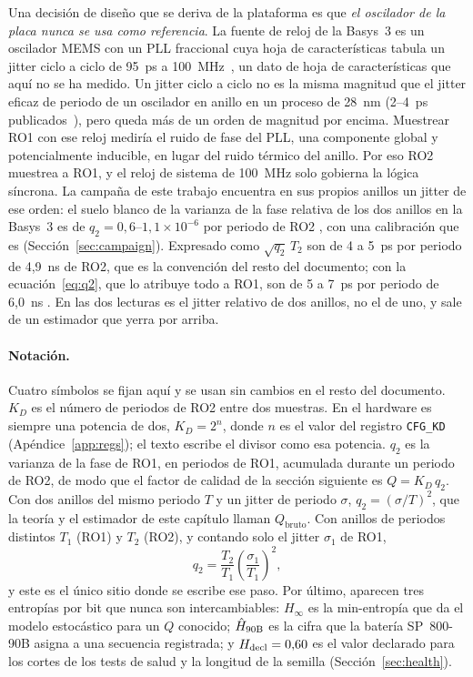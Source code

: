 Una decisión de diseño que se deriva de la plataforma es que \emph{el
oscilador de la placa nunca se usa como referencia}. La fuente de reloj de
la Basys~3 es un oscilador MEMS con un \ac{PLL} fraccional cuya hoja de
características tabula un jitter ciclo a ciclo de 95~ps a
100~MHz~\cite{micrel_dsc1033, digilent_2014_basys3rm}, un dato de hoja de
características que aquí no se ha medido. Un jitter ciclo a ciclo no es
la misma magnitud que el jitter eficaz de periodo de un oscilador en
anillo en un proceso de 28~nm (2--4~ps
publicados~\cite{petura_2016_survey}), pero queda más de un orden de
magnitud por encima. Muestrear RO1 con ese
reloj mediría el ruido de fase del PLL, una componente global y
potencialmente inducible, en lugar del ruido térmico del anillo. Por eso
RO2 muestrea a RO1, y el reloj de sistema de 100~MHz solo gobierna la
lógica síncrona. La campaña de este trabajo encuentra en sus propios
anillos un jitter de ese orden: el suelo blanco de la varianza de la fase
relativa de los dos anillos en la Basys~3 es de
$q_2 = 0{,}6$--$1{,}1\times10^{-6}$ por periodo de RO2 \meas{}, con una
calibración que es \simu{} (Sección~\ref{sec:campaign}). Expresado como
$\sqrt{q_2}\,T_2$ son de 4 a 5~ps por periodo de 4,9~ns de RO2, que es la
convención del resto del documento; con la ecuación~\eqref{eq:q2}, que lo
atribuye todo a RO1, son de 5 a 7~ps por periodo de 6,0~ns \est{}. En las
dos lecturas es el jitter relativo de dos anillos, no el de uno, y sale
de un estimador que yerra por arriba.

\paragraph{Notación.} Cuatro símbolos se fijan aquí y se usan sin cambios
en el resto del documento. $K_D$ es el número de periodos de RO2 entre dos
muestras. En el hardware es siempre una potencia de dos, $K_D = 2^{n}$,
donde $n$ es el valor del registro \texttt{CFG\_KD}
(Apéndice~\ref{app:regs}); el texto escribe el divisor como esa potencia.
$q_2$ es la varianza de la fase de RO1, en periodos de RO1, acumulada
durante un periodo de RO2, de modo que el factor de calidad de la sección
siguiente es $Q = K_D\,q_2$. Con dos anillos del mismo periodo $T$ y un
jitter de periodo $\sigma$, $q_2 = (\sigma/T)^2$, que la teoría y el
estimador de este capítulo llaman $Q_{\mathrm{bruto}}$. Con anillos de
periodos distintos $T_1$ (RO1) y $T_2$ (RO2), y contando solo el jitter
$\sigma_1$ de RO1,
\begin{equation}
  q_2 = \frac{T_2}{T_1}\left(\frac{\sigma_1}{T_1}\right)^{2} ,
  \label{eq:q2}
\end{equation}
y este es el único sitio donde se escribe ese paso. Por último, aparecen
tres entropías por bit que nunca son intercambiables: $H_\infty$ es la
min-entropía que da el modelo estocástico para un $Q$ conocido; $\hat{H}_{\mathrm{90B}}$ es
la cifra que la batería SP~800-90B asigna a una secuencia registrada; y
$H_{\mathrm{decl}} = 0{,}60$ es el valor declarado para los cortes de los tests de
salud y la longitud de la semilla (Sección~\ref{sec:health}).

